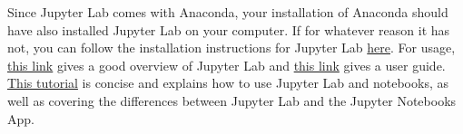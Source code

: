\documentclass[letterpaper, 12pt]{article}
\begin{document}
Since Jupyter Lab comes with Anaconda, your installation of Anaconda should have also installed Jupyter Lab on your computer. If for whatever reason it has not, you can follow the installation instructions for Jupyter Lab \href{https://jupyterlab.readthedocs.io/en/stable/getting_started/installation.html}{here}. For usage, \href{https://jupyterlab.readthedocs.io/en/stable/getting_started/overview.html}{this link} gives a good overview of Jupyter Lab and \href{https://jupyterlab.readthedocs.io/en/stable/user/interface.html}{this link} gives a user guide. \href{https://ipython-books.github.io/36-introducing-jupyterlab/}{This tutorial} is concise and explains how to use Jupyter Lab and notebooks, as well as covering the differences between Jupyter Lab and the Jupyter Notebooks App.
\end{document}
